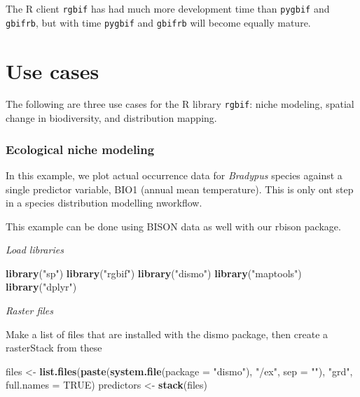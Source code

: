 \documentclass[author-year, review, 11pt]{components/elsarticle} %
\newenvironment{Shaded}{\begin{snugshade}}{\end{snugshade}}
\newcommand{\KeywordTok}[1]{\textcolor[rgb]{0.13,0.29,0.53}{\textbf{#1}}}
\newcommand{\DataTypeTok}[1]{\textcolor[rgb]{0.13,0.29,0.53}{#1}}
\newcommand{\StringTok}[1]{\textcolor[rgb]{0.31,0.60,0.02}{#1}}
\newcommand{\OtherTok}[1]{\textcolor[rgb]{0.56,0.35,0.01}{#1}}
\newcommand{\NormalTok}[1]{#1}
\begin{document}
The R client \texttt{rgbif} has had much more development time than
\texttt{pygbif} and \texttt{gbifrb}, but with time \texttt{pygbif} and
\texttt{gbifrb} will become equally mature.

\section{Use cases}\label{use-cases}

The following are three use cases for the R library \texttt{rgbif}:
niche modeling, spatial change in biodiversity, and distribution
mapping.

\subsubsection{Ecological niche
modeling}\label{ecological-niche-modeling}

In this example, we plot actual occurrence data for \emph{Bradypus}
species against a single predictor variable, BIO1 (annual mean
temperature). This is only ont step in a species distribution modelling
nworkflow.

This example can be done using BISON data as well with our rbison
package.

\emph{Load libraries}

\begin{Shaded}
\begin{Highlighting}[]
\KeywordTok{library}\NormalTok{(}\StringTok{"sp"}\NormalTok{)}
\KeywordTok{library}\NormalTok{(}\StringTok{"rgbif"}\NormalTok{)}
\KeywordTok{library}\NormalTok{(}\StringTok{"dismo"}\NormalTok{)}
\KeywordTok{library}\NormalTok{(}\StringTok{"maptools"}\NormalTok{)}
\KeywordTok{library}\NormalTok{(}\StringTok{"dplyr"}\NormalTok{)}
\end{Highlighting}
\end{Shaded}

\emph{Raster files}

Make a list of files that are installed with the dismo package, then
create a rasterStack from these

\begin{Shaded}
\begin{Highlighting}[]
\NormalTok{files <-}\StringTok{ }\KeywordTok{list.files}\NormalTok{(}\KeywordTok{paste}\NormalTok{(}\KeywordTok{system.file}\NormalTok{(}\DataTypeTok{package =} \StringTok{"dismo"}\NormalTok{), }\StringTok{"/ex"}\NormalTok{, }\DataTypeTok{sep =} \StringTok{""}\NormalTok{),}
                    \StringTok{"grd"}\NormalTok{, }\DataTypeTok{full.names =} \OtherTok{TRUE}\NormalTok{)}
\NormalTok{predictors <-}\StringTok{ }\KeywordTok{stack}\NormalTok{(files)}
\end{Highlighting}
\end{Shaded}
\end{document}
